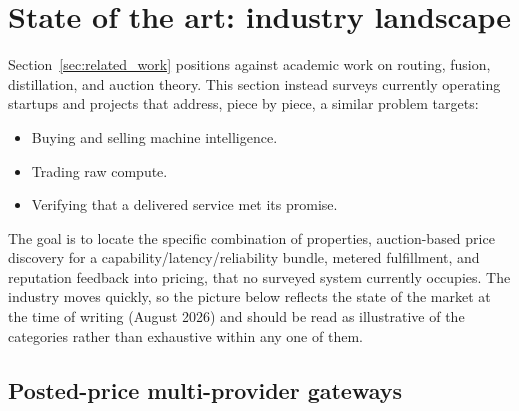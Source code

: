 \section{State of the art: industry landscape}
\label{sec:state_of_the_art}

Section~\ref{sec:related_work} positions \Noesis{} against academic work on
routing, fusion, distillation, and auction theory. This section instead
surveys currently operating startups and projects that address, piece by
piece, a similar problem \Noesis{} targets:

\begin{itemize}
  \item Buying and selling machine intelligence.
  \item Trading raw compute.
  \item Verifying that a delivered service met its promise.
\end{itemize}

The goal is to locate the specific combination of properties,
auction-based price discovery for a capability/latency/reliability bundle,
metered fulfillment, and reputation feedback into pricing, that no surveyed
system currently occupies. The industry moves quickly, so the picture below
reflects the state of the market at the time of writing (August 2026) and
should be read as illustrative of the categories rather than exhaustive within
any one of them.


\subsection{Posted-price multi-provider gateways}
\label{sec:sota_gateways}


